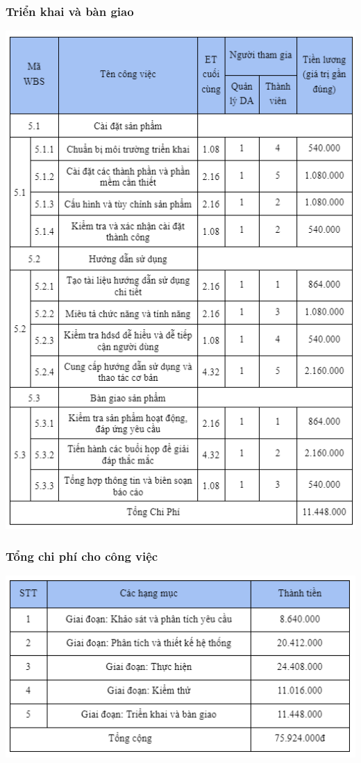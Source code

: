 \documentclass[12pt]{article}
\begin{document}
\subsubsection{Triển khai và bàn giao}
\includegraphics[width=15cm]{ChiPhi8.png}
\vspace{0.5cm}

\subsubsection{Tổng chi phí cho công việc}
\includegraphics[width=15cm]{ChiPhi9.png}
\vspace{0.5cm}
\end{document}
